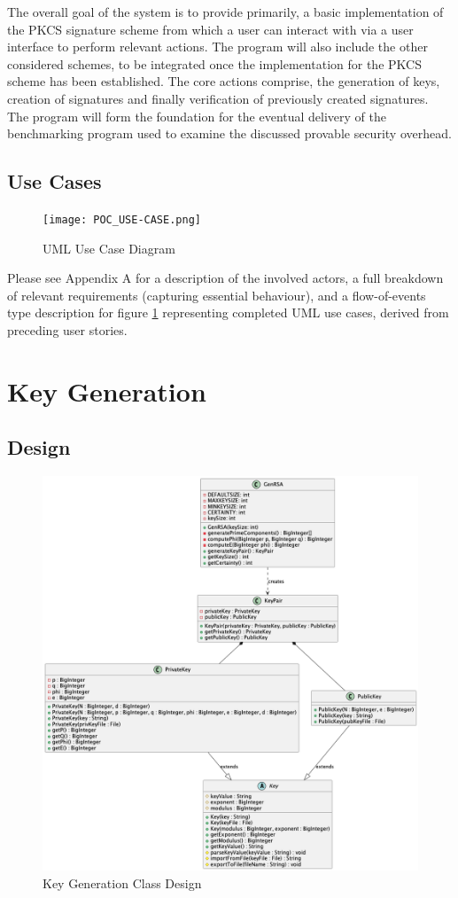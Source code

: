 \documentclass[]{final_report}
\theoremstyle{definition}
\begin{document}
The overall goal of the system is to provide primarily, a basic implementation of the PKCS signature scheme from which a user can interact with via a user interface to perform relevant actions. The program will also include the other considered schemes, to be integrated once the implementation for the PKCS scheme has been established.
The core actions comprise, the generation of keys, creation of signatures and finally verification of previously created signatures. 
The program will form the foundation for the eventual delivery of the benchmarking program used to examine the discussed provable security overhead.

\subsection{Use Cases}
\begin{figure}[H]
    \centering
    \texttt{[image: POC\_USE-CASE.png]}
    \caption{UML Use Case Diagram}
    \label{fig:uc}
\end{figure}

Please see Appendix A for a description of the involved actors, a full breakdown of relevant requirements (capturing essential behaviour), and a flow-of-events type description for figure \ref{fig:uc} representing completed UML use cases, derived from preceding user stories.

\section{Key Generation}
\subsection{Design}
\begin{figure}[H]
    \centering
    \includegraphics[scale=0.48]{KeyGeneration.png}
    \caption{Key Generation Class Design}
    \label{fig:kg}
\end{figure}
\end{document}
